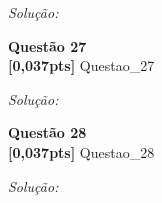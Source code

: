 \documentclass{article}
\newenvironment{problem}[2][Questão]
    { \begin{mdframed}[backgroundcolor=gray!20] \textbf{#1 #2} \\}
    {  \end{mdframed}}
\newenvironment{solution}
    {\textit{Solução:}}
    {}
\begin{document}
\begin{solution}



\end{solution}

\begin{problem}{27}
\textbf{[0,037pts]} Questao\_27
\end{problem}

\begin{solution}


\end{solution}

\begin{problem}{28}
\textbf{[0,037pts]} Questao\_28
\end{problem}

\begin{solution}


\end{solution}
\end{document}
